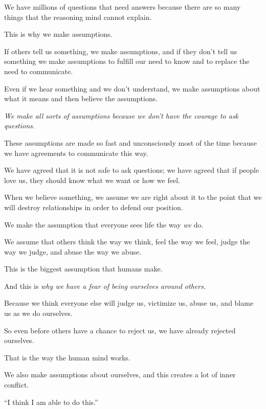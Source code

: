 \documentclass{article}
\numberwithin{equation}{section}
\begin{document}

We have millions of questions that need answers because there are so many things that the reasoning mind cannot explain.


This is why we make assumptions.

%
If others tell us something, we make assumptions, and if they don't tell us something we make assumptions to fulfill our need to know and to replace the need to communicate.

Even if we hear something and we don't understand, we make assumptions about what it means and then believe the assumptions.

\textit{We make all sorts of assumptions because we don't have the courage to ask questions}.

%
These assumptions are made so fast and unconsciously most of the time because we have agreements to communicate this way.

We have agreed that it is not safe to ask questions; we have agreed that if people love us, they should know what we want or how we feel.

When we believe something, we assume we are right about it to the point that we will destroy relationships in order to defend our position.

%
We make the assumption that everyone sees life the way \textit{we} do.

We assume that others think the way we think, feel the way we feel, judge the way we judge, and abuse the way we abuse.

This is the biggest assumption that humans make.

And this is \textit{why we have a fear of being ourselves around others}.

Because we think everyone else will judge us, victimize us, abuse us, and blame us as we do ourselves.

So even before others have a chance to reject us, we have already rejected ourselves.

That is the way the human mind works.

%
We also make assumptions about ourselves, and this creates a lot of inner conflict.

``I think I am able to do this.''
\end{document}
